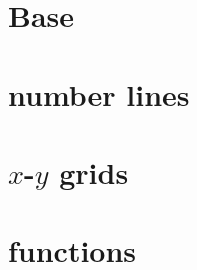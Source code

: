 \documentclass{article}
\begin{document}
\section{Base}


\section{number lines}


\section{$x$-$y$ grids}


\section{functions}


 
\end{document}
